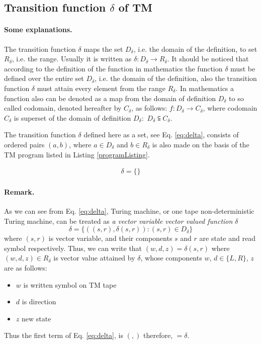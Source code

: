 \documentclass[12pt, a4paper]{report}
\begin{document}
	
	\subsection{Transition function $ \delta $ of TM}
	\paragraph{Some explanations.} The transition function $ \delta $ maps the set $ D_{\delta} $, i.e. the domain of the definition, to set $ R_{\delta} $, i.e. the range. Usually it is written as $ \delta: D_{\delta} \to R_{\delta} $.  It should be noticed that according to the definition of the function in mathematics the function $ \delta $ must be defined over the entire set $ D_{\delta} $, i.e. the domain of the definition, also the transition function $ \delta $ must attain every element from the range $ R_{\delta} $. In mathematics a function also can be denoted as a map from the domain of definition $ D_{\delta} $ to so called codomain, denoted hereafter by $ C_{\delta} $, as follows: $ f: D_{\delta} \to C_{\delta} $, where codomain $ C_{\delta} $ is superset of the domain of definition $ D_{\delta}: $ $ D_{\delta} \subseteqq C_{\delta} $.
	
	The transition function $ \delta $ defined here as a set, see Eq. \ref{eq:delta}, consists of ordered pairs $ (a , b) $, where $ a \in D_{\delta} $ and $ b \in R_{\delta}  $ is also made on the basis of the TM program listed in Listing \ref{programListing}.
	
	\begin{equation} \label{eq:delta}
	\begin{aligned}
	\delta = \{
		\}
	\end{aligned}
	\end{equation}
	\paragraph{Remark.} As we can see from Eq. \eqref{eq:delta}, Turing machine, or one tape non-deterministic Turing machine, can be treated as \emph{a vector variable vector valued function} $ \delta $
	\begin{equation}\label{key}
		\delta = \{((s, r), \delta(s, r)) : (s, r) \in D_{\delta} \} 
	\end{equation}
	where $ (s, r) $ is vector variable, and their components $ s $ and $ r $ are state and read symbol respectively. Thus, we can write that $ (w, d, z) = \delta(s, r) $ where $ (w, d, z) \in R_{\delta} $ is vector value attained by $ \delta $, whose components   $ w $, $ d \in \{L, R\} $, $ z $ are as follows:
	\begin{itemize}
		\item $ w $ is  written symbol on TM tape
		\item $ d $ is direction
		\item $ z $ new state
	\end{itemize}
	Thus the first term of Eq. \eqref{eq:delta}, is $ (
	,
	) $ therefore, $
	=\delta%
	$.
	
\end{document}
